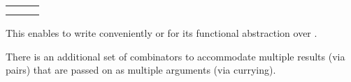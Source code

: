 \begin{isabellebody}
\begin{isamarkuptext}
  \medskip
  \begin{tabular}{lll}
  \isa{x\ {\isaliteral{7C}{\isacharbar}}{\isaliteral{3E}{\isachargreater}}\ f} & \isa{{\isaliteral{5C3C65717569763E}{\isasymequiv}}} & \isa{f\ x} \\
  \isa{f\ {\isaliteral{23}{\isacharhash}}{\isaliteral{3E}{\isachargreater}}\ g} & \isa{{\isaliteral{5C3C65717569763E}{\isasymequiv}}} & \isa{x\ {\isaliteral{7C}{\isacharbar}}{\isaliteral{3E}{\isachargreater}}\ f\ {\isaliteral{7C}{\isacharbar}}{\isaliteral{3E}{\isachargreater}}\ g} \\
  \end{tabular}
  \medskip

  This enables to write conveniently  or
   for its functional abstraction over .

  \medskip There is an additional set of combinators to accommodate
  multiple results (via pairs) that are passed on as multiple
  arguments (via currying).


\end{isamarkuptext}
\end{isabellebody}
